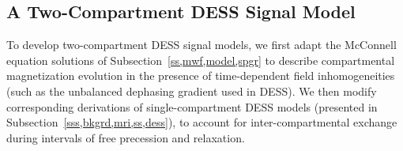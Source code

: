 \subsection{A Two-Compartment DESS Signal Model}
\label{ss,mwf,model,dess}

To develop two-compartment DESS signal models,
we first adapt the McConnell equation solutions
of Subsection~\ref{ss,mwf,model,spgr}
to describe compartmental magnetization evolution
in the presence of time-dependent field inhomogeneities
(such as the unbalanced dephasing gradient used in DESS).
We then modify corresponding derivations
of single-compartment DESS models
(presented in Subsection~\ref{sss,bkgrd,mri,ss,dess}),
to account for inter-compartmental exchange 
during intervals of free precession and relaxation.

